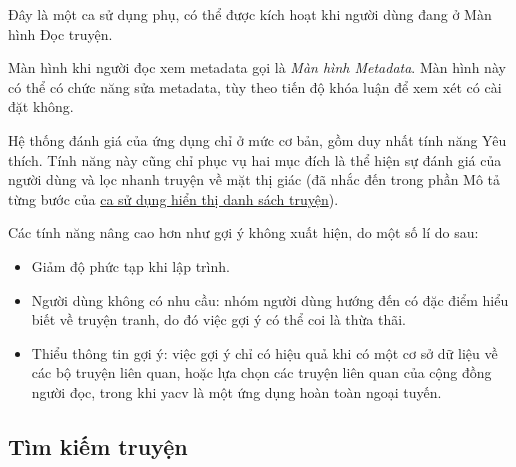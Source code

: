 \documentclass[../../thesis]{subfiles}
\begin{document}
Đây là một ca sử dụng phụ, có thể được kích hoạt khi người dùng đang ở Màn hình
Đọc truyện.

Màn hình khi người đọc xem metadata gọi là \emph{Màn hình Metadata}. Màn hình
này có thể có chức năng sửa metadata, tùy theo tiến độ khóa luận để xem xét có
cài đặt không.

Hệ thống đánh giá của ứng dụng chỉ ở mức cơ bản, gồm duy nhất tính năng Yêu
thích. Tính năng này cũng chỉ phục vụ hai mục đích là thể hiện sự đánh giá của
người dùng và lọc nhanh truyện về mặt thị giác (đã nhắc đến trong phần Mô tả
từng bước của \hyperref[sec:show-library]{ca sử dụng hiển thị danh sách
truyện}).

Các tính năng nâng cao hơn như gợi ý không xuất hiện, do một số lí do sau:

\begin{itemize}
    \item
        Giảm độ phức tạp khi lập trình.
    \item
        Người dùng không có nhu cầu: nhóm người dùng hướng đến có đặc điểm hiểu
        biết về truyện tranh, do đó việc gợi ý có thể coi là thừa thãi.
    \item
        Thiểu thông tin gợi ý: việc gợi ý chỉ có hiệu quả khi có một cơ sở dữ
        liệu về các bộ truyện liên quan, hoặc lựa chọn các truyện liên quan của
        cộng đồng người đọc, trong khi yacv là một ứng dụng hoàn toàn ngoại
        tuyến.
\end{itemize}

\subsection{Tìm kiếm truyện}\label{sec:search-comic}
\end{document}
